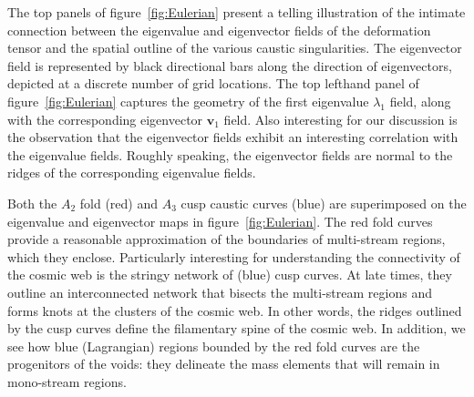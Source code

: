 \documentclass[a4paper, 11pt]{article}
\begin{document}
\bigskip
The top panels of figure~\ref{fig:Eulerian} present a telling illustration of the intimate connection between the eigenvalue and eigenvector fields of the deformation tensor and the spatial outline of the various caustic singularities. The eigenvector field is represented by black directional bars along the direction of eigenvectors, depicted at a discrete number of grid locations. The top lefthand panel of figure~\ref{fig:Eulerian} captures the geometry of the first eigenvalue $\lambda_1$ field, along with the corresponding eigenvector $\bm{v}_1$ field.   Also interesting for our discussion is the observation that the eigenvector fields exhibit an interesting correlation with the eigenvalue fields. Roughly speaking, the eigenvector fields are normal to the ridges of the corresponding eigenvalue fields.

Both the $A_2$ fold (red) and $A_3$ cusp caustic curves (blue) are superimposed on the eigenvalue and eigenvector maps in figure~\ref{fig:Eulerian}. The red fold curves provide a reasonable approximation of the boundaries of multi-stream regions, which they enclose. Particularly interesting for understanding the connectivity of the cosmic web is the stringy network of (blue) cusp curves. At late times, they outline an interconnected network that bisects the multi-stream regions and forms knots at the clusters of the cosmic web. In other words, the ridges outlined by the cusp curves define the filamentary spine of the cosmic web. In addition, we see how blue (Lagrangian) regions bounded by the red fold curves are the progenitors of the voids: they delineate the mass elements that will remain in mono-stream regions. 
\end{document}
